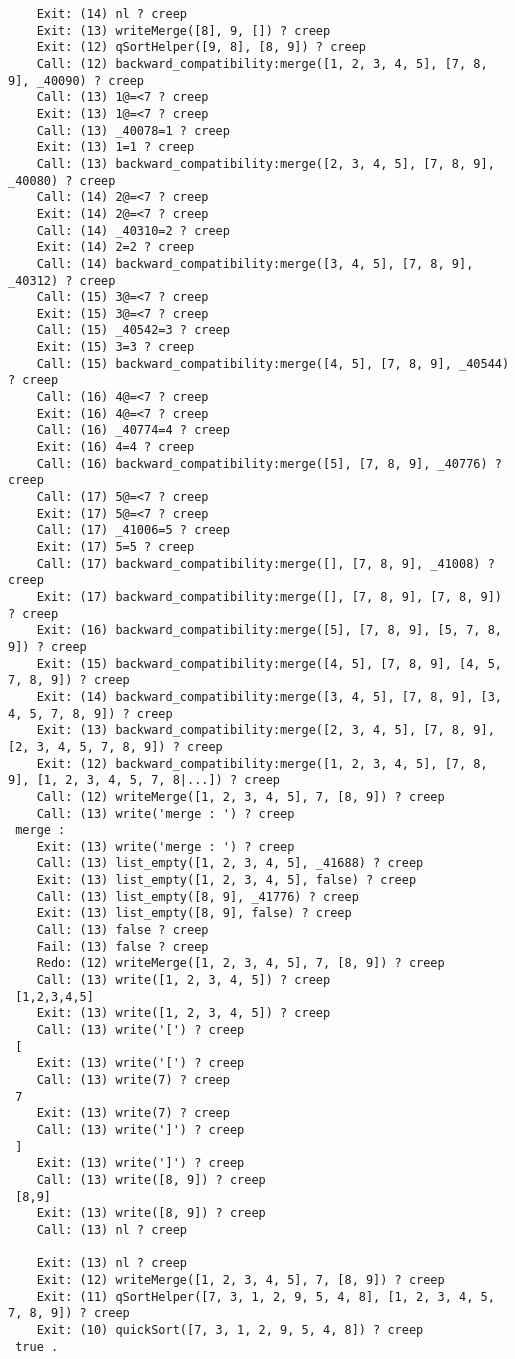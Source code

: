 \documentclass{article}
\begin{document}
\begin{lstlisting}
	Exit: (14) nl ? creep
	Exit: (13) writeMerge([8], 9, []) ? creep
	Exit: (12) qSortHelper([9, 8], [8, 9]) ? creep
	Call: (12) backward_compatibility:merge([1, 2, 3, 4, 5], [7, 8, 9], _40090) ? creep
	Call: (13) 1@=<7 ? creep
	Exit: (13) 1@=<7 ? creep
	Call: (13) _40078=1 ? creep
	Exit: (13) 1=1 ? creep
	Call: (13) backward_compatibility:merge([2, 3, 4, 5], [7, 8, 9], _40080) ? creep
	Call: (14) 2@=<7 ? creep
	Exit: (14) 2@=<7 ? creep
	Call: (14) _40310=2 ? creep
	Exit: (14) 2=2 ? creep
	Call: (14) backward_compatibility:merge([3, 4, 5], [7, 8, 9], _40312) ? creep
	Call: (15) 3@=<7 ? creep
	Exit: (15) 3@=<7 ? creep
	Call: (15) _40542=3 ? creep
	Exit: (15) 3=3 ? creep
	Call: (15) backward_compatibility:merge([4, 5], [7, 8, 9], _40544) ? creep
	Call: (16) 4@=<7 ? creep
	Exit: (16) 4@=<7 ? creep
	Call: (16) _40774=4 ? creep
	Exit: (16) 4=4 ? creep
	Call: (16) backward_compatibility:merge([5], [7, 8, 9], _40776) ? creep
	Call: (17) 5@=<7 ? creep
	Exit: (17) 5@=<7 ? creep
	Call: (17) _41006=5 ? creep
	Exit: (17) 5=5 ? creep
	Call: (17) backward_compatibility:merge([], [7, 8, 9], _41008) ? creep
	Exit: (17) backward_compatibility:merge([], [7, 8, 9], [7, 8, 9]) ? creep
	Exit: (16) backward_compatibility:merge([5], [7, 8, 9], [5, 7, 8, 9]) ? creep
	Exit: (15) backward_compatibility:merge([4, 5], [7, 8, 9], [4, 5, 7, 8, 9]) ? creep
	Exit: (14) backward_compatibility:merge([3, 4, 5], [7, 8, 9], [3, 4, 5, 7, 8, 9]) ? creep
	Exit: (13) backward_compatibility:merge([2, 3, 4, 5], [7, 8, 9], [2, 3, 4, 5, 7, 8, 9]) ? creep
	Exit: (12) backward_compatibility:merge([1, 2, 3, 4, 5], [7, 8, 9], [1, 2, 3, 4, 5, 7, 8|...]) ? creep
	Call: (12) writeMerge([1, 2, 3, 4, 5], 7, [8, 9]) ? creep
	Call: (13) write('merge : ') ? creep
 merge :
	Exit: (13) write('merge : ') ? creep
	Call: (13) list_empty([1, 2, 3, 4, 5], _41688) ? creep
	Exit: (13) list_empty([1, 2, 3, 4, 5], false) ? creep
	Call: (13) list_empty([8, 9], _41776) ? creep
	Exit: (13) list_empty([8, 9], false) ? creep
	Call: (13) false ? creep
	Fail: (13) false ? creep
	Redo: (12) writeMerge([1, 2, 3, 4, 5], 7, [8, 9]) ? creep
	Call: (13) write([1, 2, 3, 4, 5]) ? creep
 [1,2,3,4,5]
	Exit: (13) write([1, 2, 3, 4, 5]) ? creep
	Call: (13) write('[') ? creep
 [
	Exit: (13) write('[') ? creep
	Call: (13) write(7) ? creep
 7
	Exit: (13) write(7) ? creep
	Call: (13) write(']') ? creep
 ]
	Exit: (13) write(']') ? creep
	Call: (13) write([8, 9]) ? creep
 [8,9]
	Exit: (13) write([8, 9]) ? creep
	Call: (13) nl ? creep
 
	Exit: (13) nl ? creep
	Exit: (12) writeMerge([1, 2, 3, 4, 5], 7, [8, 9]) ? creep
	Exit: (11) qSortHelper([7, 3, 1, 2, 9, 5, 4, 8], [1, 2, 3, 4, 5, 7, 8, 9]) ? creep
	Exit: (10) quickSort([7, 3, 1, 2, 9, 5, 4, 8]) ? creep
 true .
 
\end{lstlisting}
\end{document}
